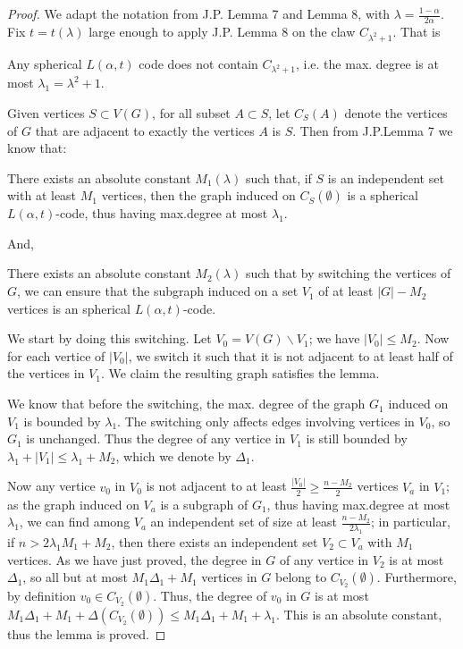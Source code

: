 \documentclass{article}
\theoremstyle{definition} %
\theoremstyle{plain} %
\begin{document}
\begin{proof}
We adapt the notation from J.P. Lemma 7 and Lemma 8, with $\lambda = \frac{1-\alpha}{2\alpha}$. Fix $t = t(\lambda)$ large enough to apply J.P. Lemma 8 on the claw $C_{\lambda^2+1}$. That is

Any spherical $L(\alpha, t)$ code does not contain $C_{\lambda^2+1}$, i.e. the max. degree is at most $\lambda_1 = \lambda^2+1$.

Given vertices $S\subset V(G)$, for all subset $A\subset S$, let $C_S(A)$ denote the vertices of $G$ that are adjacent to exactly the vertices $A$ is $S$. Then from J.P.Lemma 7 we know that:

There exists an absolute constant $M_1(\lambda)$ such that, if $S$ is an independent set with at least $M_1$ vertices, then the graph induced on $C_{S}(\emptyset)$ is a spherical $L(\alpha, t)$-code, thus having max.degree at most $\lambda_1$.

And,

There exists an absolute constant $M_2(\lambda)$ such that by switching the vertices of $G$, we can ensure that the subgraph induced on a set $V_1$ of at least $|G| - M_2$ vertices is an spherical $L(\alpha, t)$-code.

We start by doing this switching. Let $V_0 = V(G)\backslash V_1$; we have $|V_0| \leq M_2$. Now for each vertice of $|V_0|$, we switch it such that it is not adjacent to at least half of the vertices in $V_1$. We claim the resulting graph satisfies the lemma.

We know that before the switching, the max. degree of the graph $G_1$ induced on $V_1$ is bounded by $\lambda_1$. The switching only affects edges involving vertices in $V_0$, so $G_1$ is unchanged. Thus the degree of any vertice in $V_1$ is still bounded by $\lambda_1 + |V_1| \leq \lambda_1+M_2$, which we denote by $\Delta_1$.

Now any vertice $v_0$ in $V_0$ is not adjacent to at least $\frac{|V_0|}{2} \geq \frac{n-M_2}{2}$ vertices $V_a$ in $V_1$; as the graph induced on $V_a$ is a subgraph of $G_1$, thus having max.degree at most $\lambda_1$, we can find among $V_a$ an independent set of size at least $\frac{n-M_2}{2\lambda_1}$; in particular, if $n > 2\lambda_1M_1 + M_2$, then there exists an independent set $V_2\subset V_a$ with $M_1$ vertices. As we have just proved, the degree in $G$ of any vertice in $V_2$ is at most $\Delta_1$, so all but at most $M_1\Delta_1 + M_1$ vertices in $G$ belong to $C_{V_2}(\emptyset)$. Furthermore, by definition $v_0\in C_{V_2}(\emptyset)$. Thus, the degree of $v_0$ in $G$ is at most $M_1\Delta_1 + M_1 + \Delta(C_{V_2}(\emptyset)) \leq M_1\Delta_1 + M_1 + \lambda_1$. This is an absolute constant, thus the lemma is proved.
\end{proof} 
\end{document}

